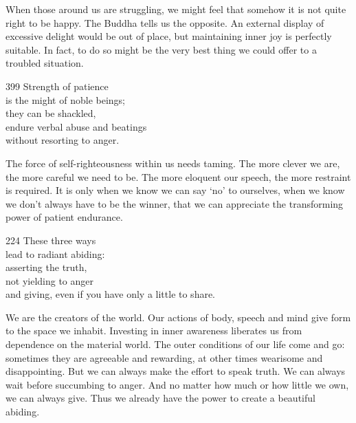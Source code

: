 \begin{dhpRefl}
  When those around us are struggling, we might feel that somehow it is not
  quite right to be happy. The Buddha tells us the opposite. An external display
  of excessive delight would be out of place, but maintaining inner joy is
  perfectly suitable. In fact, to do so might be the very best thing we could
  offer to a troubled situation.
\end{dhpRefl}


\begin{dhpVerse}{399}
\label{dhp-399}
Strength of patience\\
is the might of noble beings;\\
they can be shackled,\\
endure verbal abuse and beatings\\
without resorting to anger.
\end{dhpVerse}

\begin{dhpRefl}
  The force of self-righteousness within us needs taming. The more clever we
  are, the more careful we need to be. The more eloquent our speech, the more
  restraint is required. It is only when we know we can say `no' to ourselves,
  when we know we don't always have to be the winner, that we can appreciate the
  transforming power of patient endurance.
\end{dhpRefl}


\begin{dhpVerse}{224}
\label{dhp-224}
These three ways\\
lead to radiant abiding:\\
asserting the truth,\\
not yielding to anger\\
and giving, even if you have only a little to share.
\end{dhpVerse}

\begin{dhpRefl}
  We are the creators of the world. Our actions of body, speech and mind give
  form to the space we inhabit. Investing in inner awareness liberates us from
  dependence on the material world. The outer conditions of our life come and
  go: sometimes they are agreeable and rewarding, at other times wearisome and
  disappointing. But we can always make the effort to speak truth. We can always
  wait before succumbing to anger. And no matter how much or how little we own,
  we can always give. Thus we already have the power to create a beautiful
  abiding.
\end{dhpRefl}

